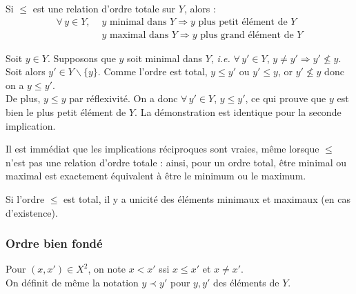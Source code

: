 			\eqskip{2mm}
			\begin{Propriete}
				Si \(\leqslant\) est une relation d'ordre totale sur \(Y\), alors :
					\begin{align*}
						\forall \,y \in Y, \,\, & y \text{ minimal dans } Y \Longrightarrow y \text{ plus petit élément de } Y \\[-1mm]
						& y \text{ maximal dans } Y \Longrightarrow y \text{ plus grand élément de } Y
					\end{align*}
			\end{Propriete}
			\begin{Preuve}
				Soit \(y \in Y\). Supposons que \(y\) soit minimal dans \(Y\), \emph{i.e.} \(\forall \,y' \in Y\), \(y \neq y' \Longrightarrow y' \nleqslant y\). \nt
				\bdot Soit alors \(y' \in Y\backslash\{y\}\). Comme l'ordre est total, \(y \leq y'\) ou \(y' \leqslant y\), or \(y' \nleqslant y\) donc on a \(y \leqslant y'\). \\
				\bdot De plus, \(y \leq y\) par réflexivité. \nt
				On a donc \(\forall \,y' \in Y\), \(y \leqslant y'\), ce qui prouve que \(y\) est bien le plus petit élément de \(Y\). La démonstration est identique pour la seconde implication.
			\end{Preuve}
			
			\begin{Remarque}
				 Il est immédiat que les implications réciproques sont vraies, même lorsque \(\leqslant\) n'est pas une relation d'ordre totale : ainsi, pour un ordre total, être minimal ou maximal est exactement équivalent à être le minimum ou le maximum.
			\end{Remarque}
			
			\begin{Corollaire}
				Si l'ordre \(\leqslant\) est total, il y a unicité des éléments minimaux et maximaux (en cas d'existence).
			\end{Corollaire}
			
		
		\subsubsection{Ordre bien fondé}
		
			
			\begin{Notation}
				Pour \((x,x') \in X^2\), on note \(x < x'\) ssi \(x \leqslant x'\) et \(x \neq x'\). \\
				On définit de même la notation \(y \prec y'\) pour \(y,y'\) des éléments de \(Y\).
			\end{Notation}
			

